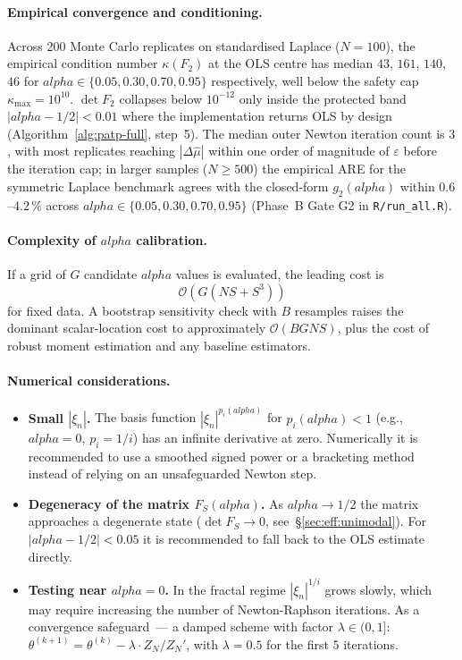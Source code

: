 \documentclass[11pt]{article}
\def\alpha{alpha}%
\def\mathbf#1{#1}%
\def\tfrac#1#2{#1/#2}%
\theoremstyle{definition}
\begin{document}
\paragraph{Empirical convergence and conditioning.}
Across 200 Monte Carlo replicates on standardised Laplace ($N=100$), the
empirical condition number $\kappa(\mathbf{F}_2)$ at the OLS centre has
median $43$, $161$, $140$, $46$ for $\alpha\in\{0.05,0.30,0.70,0.95\}$
respectively, well below the safety cap $\kappa_{\max}=10^{10}$.
$\det\mathbf{F}_2$ collapses below $10^{-12}$ only inside the protected
band $|\alpha-\tfrac{1}{2}|<0.01$ where the implementation returns OLS by
design (Algorithm~\ref{alg:patp-full}, step~5). The median outer Newton
iteration count is $3$, with most replicates reaching $|\Delta\hat\mu|$
within one order of magnitude of $\varepsilon$ before the iteration cap;
in larger samples ($N\geq 500$) the empirical ARE for the symmetric
Laplace benchmark agrees with the closed-form $g_2(\alpha)$ within
$0.6$--$4.2\,\%$ across $\alpha\in\{0.05,0.30,0.70,0.95\}$ (Phase~B Gate
G2 in \texttt{R/run\_all.R}).

\paragraph{Complexity of $\alpha$ calibration.}
If a grid of $G$ candidate $\alpha$ values is evaluated, the leading cost is
\[
  \mathcal{O}\!\left(G(NS+S^3)\right)
\]
for fixed data. A bootstrap sensitivity check with $B$ resamples raises the
dominant scalar-location cost to approximately $\mathcal{O}(BGNS)$, plus the
cost of robust moment estimation and any baseline estimators.

\paragraph{Numerical considerations.}

\begin{itemize}
  \item \textbf{Small $|\xi_n|$.} The basis function $|\xi_n|^{p_i(\alpha)}$
        for $p_i(\alpha) < 1$ (e.g., $\alpha = 0$, $p_i = 1/i$)
        has an infinite derivative at zero. Numerically it is recommended to
        use a smoothed signed power or a bracketing method instead of
        relying on an unsafeguarded Newton step.
  \item \textbf{Degeneracy of the matrix $\mathbf{F}_S(\alpha)$.}
        As $\alpha \to 1/2$ the matrix approaches a degenerate
        state ($\det \mathbf{F}_S \to 0$, see~\S\ref{sec:eff:unimodal}).
        For $|\alpha - 1/2| < 0.05$ it is recommended to fall back to
        the OLS estimate directly.
  \item \textbf{Testing near $\alpha = 0$.} In the fractal
        regime $|\xi_n|^{1/i}$ grows slowly, which may require
        increasing the number of Newton-Raphson iterations. As a
        convergence safeguard~--- a damped scheme with factor $\lambda \in (0, 1]$:
        $\theta^{(k+1)} = \theta^{(k)} - \lambda \cdot Z_N/Z_N'$, with
        $\lambda = 0.5$ for the first $5$ iterations.
\end{itemize}
\end{document}

